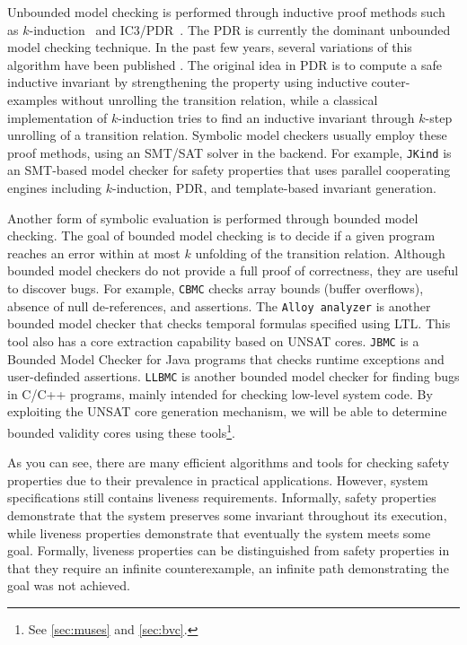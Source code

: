 Unbounded model checking is performed through inductive proof methods such as $k$-induction~\cite{SheeranSS00} and IC3/PDR~\cite{Een2011:PDR}.
The PDR is currently the dominant unbounded model checking technique. In the past few years, several variations of this algorithm have been published \cite{hoder2012generalized, vizel2014interpolating, jovanovic2016property, gurfinkelk}.
The original idea in PDR is to compute  a
safe  inductive  invariant by strengthening the property using inductive couter-examples without unrolling the transition relation, while a classical implementation of
$k$-induction tries to find an inductive invariant through
$k$-step unrolling of a transition relation. Symbolic model checkers usually employ these proof methods, using an SMT/SAT solver in the backend. For example, \texttt{JKind} \cite{jkind} is an SMT-based model checker for safety properties that uses parallel cooperating engines including $k$-induction, PDR, and template-based invariant generation.

Another form of symbolic evaluation is performed through bounded model checking.
The goal of bounded model checking is to decide if a given program reaches an error within at
most $k$ unfolding of the transition relation. Although bounded model checkers do not provide a full proof of correctness, they are useful to discover bugs. For example, \texttt{CBMC} \cite{cbmc} checks array bounds (buffer overflows), absence of
null de-references, and assertions. The \texttt{Alloy analyzer} \cite{alloy} is another bounded model checker that checks temporal formulas specified using LTL. This tool also has a core extraction capability based on UNSAT cores. \texttt{JBMC} \cite{jbmc} is a Bounded Model Checker for Java programs that checks runtime exceptions and user-definded assertions. \texttt{LLBMC} is another bounded model checker for finding bugs in C/C++ programs, mainly intended for checking low-level system code. By exploiting the UNSAT core generation mechanism, we will be able to determine bounded validity cores using these tools\footnote{See \ref{sec:muses} and \ref{sec:bvc}.}.

As you can see, there are many efficient
algorithms and tools for checking safety properties due to their prevalence in
practical applications. However, system specifications still contains liveness requirements.
Informally, safety properties demonstrate that the system preserves some invariant throughout its execution, while liveness properties demonstrate that eventually the system meets some goal.  Formally, liveness properties can be distinguished from safety properties in that they require an infinite counterexample, an infinite path demonstrating the goal was not achieved.


